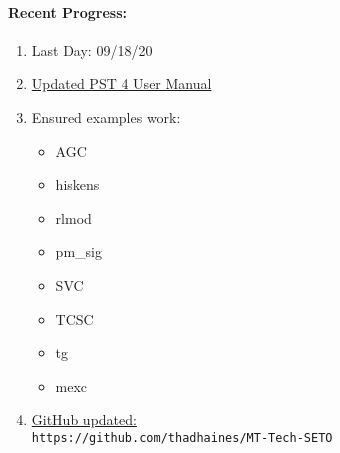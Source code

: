 \documentclass[12pt]{article}
\begin{document}
\begin{multicols}{2}
\raggedright

\paragraph{Recent Progress:}

	\begin{enumerate}
	\item Last Day: 09/18/20
		\item \href{https://github.com/thadhaines/MT-Tech-SETO/blob/master/researchDocs/TEX/PST4UserManual/template/PST4UserManual.pdf}{Updated PST 4 User Manual}
		\item Ensured examples work:
		\begin{itemize}
			\footnotesize
			\itemsep0em
			\item AGC
			\item hiskens
			\item rlmod
			\item pm\_sig
			\item SVC
			\item TCSC
			\item tg
			\item mexc
		\end{itemize}

		
	
		\item \href{https://github.com/thadhaines/MT-Tech-SETO}{GitHub updated:}\\
	{\footnotesize \verb|https://github.com/thadhaines/MT-Tech-SETO| }\\
	\end{enumerate}


\end{multicols}
\end{document}

